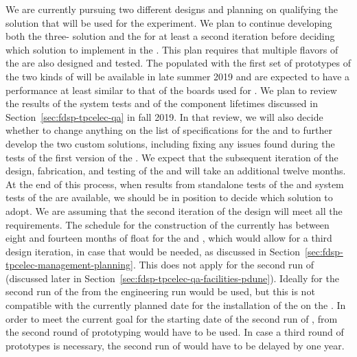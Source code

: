 We are currently pursuing two different  designs and 
planning on qualifying the   solution that 
will be used for the  experiment.
We plan to continue developing both the three- 
solution and the   for at least a second 
iteration before deciding which  solution to 
implement in the  . This plan requires
that multiple flavors of the  are also designed 
and tested. The  populated with the first set of prototypes of 
the two kinds of  will be available in late summer 2019 
and are expected to have a performance at least similar to that 
of the boards used for . We plan to review the results 
of the system tests and of the component lifetimes discussed 
in Section~\ref{sec:fdsp-tpcelec-qa} in fall 2019. 
In that review, we will also decide whether to change anything on 
the list of specifications for the  and to further develop
the two custom  solutions, including fixing any 
issues found during the tests of the first version of the . 
We expect that the subsequent iteration
of the design, fabrication, and testing of the  and
 will take an additional twelve months. At the end 
of this process, when results from standalone tests of the
 and system tests of the  are
available, we should be in position to decide which 
solution to adopt. We are assuming that the second iteration of
the  design will meet all the  requirements.
The schedule for the construction of the  
currently has between eight and fourteen months of float for the
 and , which would allow for a third 
design iteration, in case that would be needed, as discussed
in Section~\ref{sec:fdsp-tpcelec-management-planning}. This does
not apply for the second run of  (discussed
later in Section~\ref{sec:fdsp-tpcelec-qa-facilities-pdune}).
Ideally for the second run of  the 
from the engineering run would be used, but this is not compatible
with the currently planned date for the installation of the 
on the . In order to meet the current goal for the starting
date of the second run of ,  from the
second round of prototyping would have to be used. In case a
third round of prototypes is necessary, the second run of 
 would have to be delayed by one year.

